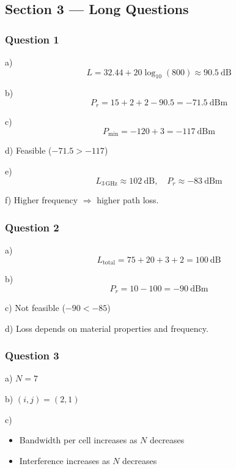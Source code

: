 \vspace{0.5cm}

\subsection*{Section 3 --- Long Questions}

\subsubsection*{Question 1}

a)
\[
L = 32.44 + 20\log_{10}(800) \approx 90.5\ \mathrm{dB}
\]

b)
\[
P_r = 15 + 2 + 2 - 90.5 = -71.5\ \mathrm{dBm}
\]

c)
\[
P_{\min} = -120 + 3 = -117\ \mathrm{dBm}
\]

d) Feasible ($-71.5 > -117$)

e)
\[
L_{3\,\mathrm{GHz}} \approx 102\ \mathrm{dB}, \quad P_r \approx -83\ \mathrm{dBm}
\]

f) Higher frequency $\Rightarrow$ higher path loss.

\vspace{0.3cm}

\subsubsection*{Question 2}

a)
\[
L_{\text{total}} = 75 + 20 + 3 + 2 = 100\ \mathrm{dB}
\]

b)
\[
P_r = 10 - 100 = -90\ \mathrm{dBm}
\]

c) Not feasible ($-90 < -85$)

d) Loss depends on material properties and frequency.

\vspace{0.3cm}

\subsubsection*{Question 3}

a) $N = 7$

b) $(i,j) = (2,1)$

c)
\begin{itemize}
\item Bandwidth per cell increases as $N$ decreases
\item Interference increases as $N$ decreases
\end{itemize}

